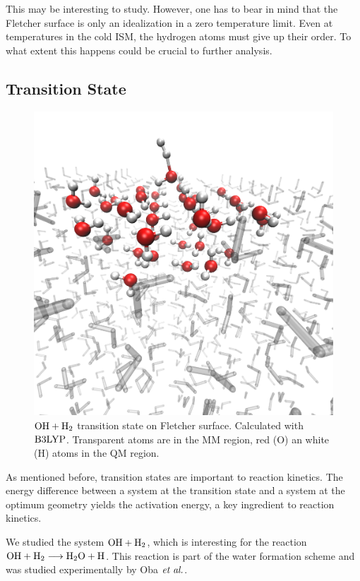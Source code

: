 \documentclass[8.5pt,twoside,twocolumn]{article}
\theoremstyle{standard}
\begin{document}
This may be interesting to study. However, one has to bear in mind that the
Fletcher surface is only an idealization in a zero temperature limit. Even at
temperatures in the cold ISM, the hydrogen atoms must give up their order. To
what extent this happens could be crucial to further analysis.


\subsection{Transition State}
\label{Sec:Adv:Trans}
\newcommand\hoht{\mbox{\enmat{\ho+\htw}}}

\begin{figure}[b!]
\includegraphics[width=.49\textwidth]{./img/FletcherAdsorption.png}
\caption{$\hoht$ transition state on Fletcher surface. Calculated with $\text{B3LYP}$.
Transparent atoms are in the MM region, red (O) an white (H) atoms in the QM
region.}
\label{Fig:Adv:TS}
\end{figure}

As mentioned before, transition states are important to reaction kinetics.
The energy difference between a system at the transition state and a system at
the optimum geometry yields the activation energy, a key ingredient to reaction
kinetics.

We studied the system $\hoht$, which is interesting for the reaction
\mbox{$\hoht\chemar\hto+\te H$}. This reaction is part of the water
formation scheme \cite{DishoeckHerbstNeufeld2013} and was studied
experimentally by Oba $\emph{et al.}$\cite{ObaWatanabeHamaEtAl2012}.
\end{document}
